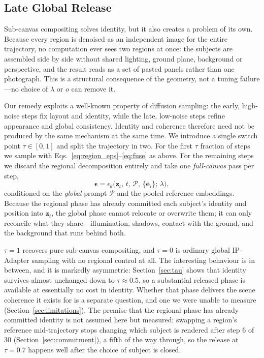 \documentclass[review,10pt,times]{elsarticle}
\begin{document}
\subsection{Late Global Release}
\label{sec:late_release}

Sub-canvas compositing solves identity, but it also creates a problem of
its own.  Because every region is denoised as an independent image for
the entire trajectory, no computation ever sees two regions at once: the
subjects are assembled side by side without shared lighting, ground
plane, background or perspective, and the result reads as a set of
pasted panels rather than one photograph.  This is a structural
consequence of the geometry, not a tuning failure---no choice of
$\lambda$ or $o$ can remove it.

Our remedy exploits a well-known property of diffusion sampling: the
early, high-noise steps fix layout and identity, while the late,
low-noise steps refine appearance and global consistency.  Identity and
coherence therefore need not be produced by the same mechanism at the
same time.  We introduce a single switch point $\tau\in[0,1]$ and split
the trajectory in two.  For the first $\tau$ fraction of steps we sample
with Eqs.~\ref{eq:region_eps}--\ref{eq:fuse} as above.  For the
remaining steps we discard the regional decomposition entirely and take
one \emph{full-canvas} pass per step,
\begin{equation}
  \boldsymbol{\epsilon} =
    \epsilon_\theta\!\bigl(\mathbf{z}_t,\,t,\,\mathcal{P},\,
    \{\mathbf{e}_i\};\,\lambda\bigr),
  \label{eq:release}
\end{equation}
conditioned on the \emph{global} prompt $\mathcal{P}$ and the pooled
reference embeddings.  Because the regional phase has already committed
each subject's identity and position into $\mathbf{z}_t$, the global
phase cannot relocate or overwrite them; it can only reconcile what they
share---illumination, shadows, contact with the ground, and the
background that runs behind both.

$\tau{=}1$ recovers pure sub-canvas compositing, and $\tau{=}0$ is
ordinary global IP-Adapter sampling with no regional control at all.
The interesting behaviour is in between, and it is markedly asymmetric:
Section~\ref{sec:tau} shows that identity survives almost unchanged down to
$\tau\!\approx\!0.5$, so a substantial released phase is available at
essentially no cost in identity.  Whether that phase delivers the scene
coherence it exists for is a separate question, and one we were unable to
measure (Section~\ref{sec:limitations}).
The premise that the regional phase has already committed identity is not
assumed here but measured: swapping a region's reference mid-trajectory stops
changing which subject is rendered after step 6 of 30
(Section~\ref{sec:commitment}), a fifth of the way through, so the release at
$\tau{=}0.7$ happens well after the choice of subject is closed.
\end{document}
